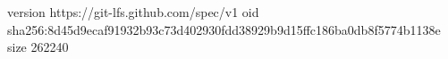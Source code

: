 version https://git-lfs.github.com/spec/v1
oid sha256:8d45d9ecaf91932b93c73d402930fdd38929b9d15ffc186ba0db8f5774b1138e
size 262240
